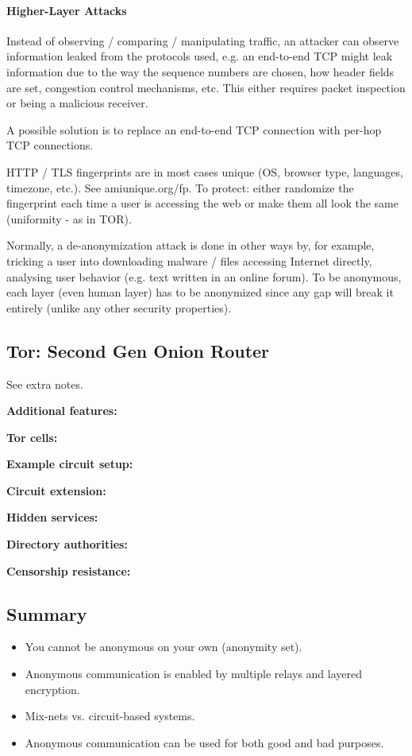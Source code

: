 \paragraph{Higher-Layer Attacks}
Instead of observing / comparing / manipulating traffic, an attacker can observe information leaked from the protocols used, e.g. an end-to-end TCP might leak information due to the way the sequence numbers are chosen, how header fields are set, congestion control mechanisms, etc. This either requires packet inspection or being a malicious receiver.

A possible solution is to replace an end-to-end TCP connection with per-hop TCP connections.

HTTP / TLS fingerprints are in most cases unique (OS, browser type, languages, timezone, etc.). See amiunique.org/fp. To protect: either randomize the fingerprint each time a user is accessing the web or make them all look the same (uniformity - as in TOR).

Normally, a de-anonymization attack is done in other ways by, for example, tricking a user into downloading malware / files accessing Internet directly, analysing user behavior (e.g. text written in an online forum). To be anonymous, each layer (even human layer) has to be anonymized since any gap will break it entirely (unlike any other security properties).



\subsection{Tor: Second Gen Onion Router}

See extra notes.

\textbf{Additional features:} 

\textbf{Tor cells:}

\textbf{Example circuit setup:}

\textbf{Circuit extension:}

\textbf{Hidden services:}

\textbf{Directory authorities:}

\textbf{Censorship resistance:} 


\subsection{Summary}

\begin{itemize}
    \item You cannot be anonymous on your own (anonymity set).
    \item Anonymous communication is enabled by multiple relays and layered encryption.
    \item Mix-nets vs. circuit-based systems.
    \item Anonymous communication can be used for both good and bad purposes.
\end{itemize}



